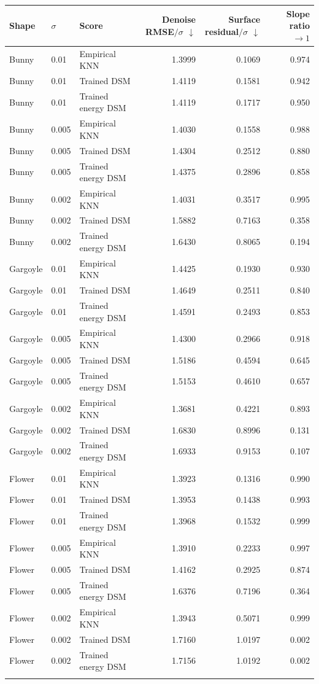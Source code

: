 \begin{tabular}{lllrrr}
\toprule
Shape & $\sigma$ & Score & Denoise RMSE$/\sigma$ $\downarrow$ & Surface residual$/\sigma$ $\downarrow$ & Slope ratio $\to 1$ \\
\midrule
Bunny & 0.01 & Empirical KNN & 1.3999 & 0.1069 & 0.974 \\
Bunny & 0.01 & Trained DSM & 1.4119 & 0.1581 & 0.942 \\
Bunny & 0.01 & Trained energy DSM & 1.4119 & 0.1717 & 0.950 \\
Bunny & 0.005 & Empirical KNN & 1.4030 & 0.1558 & 0.988 \\
Bunny & 0.005 & Trained DSM & 1.4304 & 0.2512 & 0.880 \\
Bunny & 0.005 & Trained energy DSM & 1.4375 & 0.2896 & 0.858 \\
Bunny & 0.002 & Empirical KNN & 1.4031 & 0.3517 & 0.995 \\
Bunny & 0.002 & Trained DSM & 1.5882 & 0.7163 & 0.358 \\
Bunny & 0.002 & Trained energy DSM & 1.6430 & 0.8065 & 0.194 \\
\addlinespace
Gargoyle & 0.01 & Empirical KNN & 1.4425 & 0.1930 & 0.930 \\
Gargoyle & 0.01 & Trained DSM & 1.4649 & 0.2511 & 0.840 \\
Gargoyle & 0.01 & Trained energy DSM & 1.4591 & 0.2493 & 0.853 \\
Gargoyle & 0.005 & Empirical KNN & 1.4300 & 0.2966 & 0.918 \\
Gargoyle & 0.005 & Trained DSM & 1.5186 & 0.4594 & 0.645 \\
Gargoyle & 0.005 & Trained energy DSM & 1.5153 & 0.4610 & 0.657 \\
Gargoyle & 0.002 & Empirical KNN & 1.3681 & 0.4221 & 0.893 \\
Gargoyle & 0.002 & Trained DSM & 1.6830 & 0.8996 & 0.131 \\
Gargoyle & 0.002 & Trained energy DSM & 1.6933 & 0.9153 & 0.107 \\
\addlinespace
Flower & 0.01 & Empirical KNN & 1.3923 & 0.1316 & 0.990 \\
Flower & 0.01 & Trained DSM & 1.3953 & 0.1438 & 0.993 \\
Flower & 0.01 & Trained energy DSM & 1.3968 & 0.1532 & 0.999 \\
Flower & 0.005 & Empirical KNN & 1.3910 & 0.2233 & 0.997 \\
Flower & 0.005 & Trained DSM & 1.4162 & 0.2925 & 0.874 \\
Flower & 0.005 & Trained energy DSM & 1.6376 & 0.7196 & 0.364 \\
Flower & 0.002 & Empirical KNN & 1.3943 & 0.5071 & 0.999 \\
Flower & 0.002 & Trained DSM & 1.7160 & 1.0197 & 0.002 \\
Flower & 0.002 & Trained energy DSM & 1.7156 & 1.0192 & 0.002 \\
\addlinespace
\bottomrule
\end{tabular}
